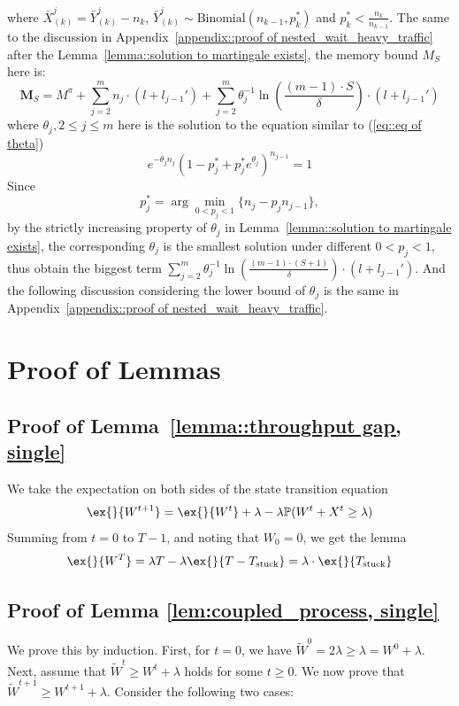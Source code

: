 \documentclass[preprint]{article}
\theoremstyle{plain}
\theoremstyle{definition}
\theoremstyle{remark}
\begin{document}
where $\bar{X}_{(k)}^{j} = \bar{Y}_{(k)}^j - n_k$, $\bar{Y}_{(k)}^j \sim \text{Binomial}(n_{k-1}, p_k^*)$ and $p_k^*<\frac{n_k}{n_{k-1}}$. The same to the discussion in Appendix~\ref{appendix::proof of nested_wait_heavy_traffic} after the Lemma~\ref{lemma::solution to martingale exists}, the memory bound $M_S$ here is:
$$\mathbf{M}_S = M^{\pi} + \sum_{j=2}^m n_j \cdot (l + l_{j-1}') + \sum_{j=2}^m \theta_j^{-1}\ln\left( \frac{(m - 1) \cdot S}{\delta} \right) \cdot (l + l_{j-1}')$$
where $\theta_j, 2\leq j\leq m$ here is the solution to the equation similar to (\ref{eq::eq of theta})
\begin{equation}
e^{-\theta_j n_j} (1 - p_j^* + p_j^* e^{\theta_j})^{n_{j-1}} = 1\label{eq::eq of theta, time varying}
\end{equation}
Since 
$$p_j^* = \arg\min_{0< p_j< 1} \{n_j - p_j n_{j-1}\},$$
by the strictly increasing property of $\theta_j$ in Lemma~\ref{lemma::solution to martingale exists}, the corresponding $\theta_j$ is the smallest solution under different $0<p_j<1$, thus obtain the biggest term $\sum_{j=2}^m \theta_j^{-1}\ln\left( \frac{(m - 1) \cdot (S + 1)}{\delta} \right) \cdot (l + l_{j-1}')$. And the following discussion considering the lower bound of $\theta_j$ is the same in Appendix~\ref{appendix::proof of nested_wait_heavy_traffic}.

\section{Proof of Lemmas}\label{sec:pf_lemmas}
\subsection{Proof of Lemma~\ref{lemma::throughput gap, single}}\label{appendix_lemma::proof of throughput gap, single}
We take the expectation on both sides of the state transition equation
$$\ex{}{W^{t+1}}=\ex{}{W^t}+\lambda - \lambda \mathbb{P}(W^t+X^t\geq \lambda)$$
Summing from $t=0$ to $T-1$, and noting that $W_0=0$, we get the lemma
$$\ex{}{W^T}=\lambda T - \lambda \ex{}{T-T_{\text{stuck}}}=\lambda\cdot \ex{}{T_{\text{stuck}}}$$

\subsection{Proof of Lemma \ref{lem:coupled_process, single}}\label{appendix_lemma::proof of coupled_process, single}
We prove this by induction. First, for $t = 0$, we have $\tilde{W}^0=2\lambda\geq \lambda=W^0+\lambda$. Next, assume that $\tilde{W}^t \geq W^t + \lambda$ holds for some $t \geq 0$. We now prove that $\tilde{W}^{t+1} \geq W^{t+1} + \lambda$. Consider the following two cases:
\end{document}
